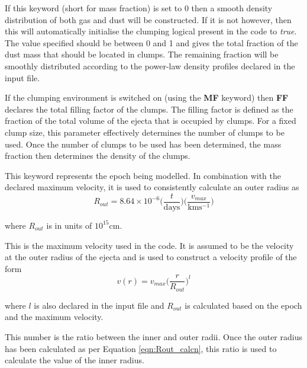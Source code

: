
 If this keyword (short for mass fraction) is set to 0 then a smooth density distribution of both gas and dust will be constructed.   If it is not however, then this will automatically initialise the clumping logical present in the code to \textit{true}.  The value specified should be between 0 and 1 and gives the total fraction of the dust mass that should be located in clumps.  The remaining fraction will be smoothly distributed according to the power-law density profiles declared in the input file.


 If the clumping environment is switched on (using the \textbf{MF} keyword) then \textbf{FF} declares the total filling factor of the clumps.  The filling factor is defined as the fraction of the total volume of the ejecta that is occupied by clumps.  For a fixed clump size, this parameter effectively determines the number of clumps to be used.  Once the number of clumps to be used has been determined, the mass fraction then determines the density of the clumps.
 

 This keyword represents the epoch being modelled.  In combination with the declared maximum velocity, it is used to consistently calculate an outer radius as 
 \begin{equation}
 R_{out}=8.64 \times 10^{-6} \Big( \frac{t}{\mathrm{days}} \Big) \Big( \frac{v_{max}}{\mathrm{kms^{-1}}} \Big)
 \label{eqn:Rout_calcn}
 \end{equation}

 \noindent where $R_{out}$ is in units of $10^{15}$cm.


 This is the maximum velocity used in the code.  It is assumed to be the velocity at the outer radius of the ejecta and is used to construct a velocity profile of the form
 \begin{equation}
 v(r) = v_{max} \Big( \frac{r}{R_{out}} \Big)^l
 \label{eqn:vel_law}
 \end{equation}

 where $l$ is also declared in the input file and $R_{out}$ is calculated based on the epoch and the maximum velocity.


 This number is the ratio between the inner and outer radii.  Once the outer radius has been calculated as per Equation \ref{eqn:Rout_calcn}, this ratio is used to calculate the value of the inner radius.

